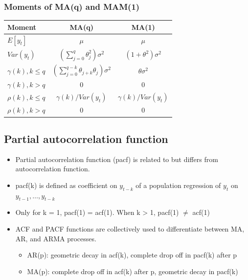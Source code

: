 \documentclass{article}
\begin{document}
\subsubsection{Moments of MA(q) and MAM(1)}
\begin{table}[h]
  \begin{center}
  \begin{tabular}{lcc}
       \textbf{Moment} & \textbf{MA(q)} & \textbf{MA(1)} \\
       \midrule
      $E[y_t]$ & $\mu$ & $\mu$ \\
      $Var(y_t)$ & $\left(\sum_{j=0}^q \theta^2_j \right)\sigma^2$& $(1 + \theta^2)\sigma^2$\\
      $\gamma(k), k \leq q$ & $\left(\sum_{j=0}^{q-k} \theta_{j+k}\theta_j \right)\sigma^2$& $\theta\sigma^2$ \\
      $\gamma(k), k > q$ & 0 & 0 \\
      $\rho(k), k \leq q$ & $\gamma(k)/Var(y_t)$ & $\gamma(k)/Var(y_t)$\\
      $\rho(k), k > q$ & 0& 0\\
      \bottomrule
  \end{tabular}
  \end{center}
\end{table}

\subsection{Partial autocorrelation function}
\begin{itemize}
  \item Partial autocorrelation function (pacf) is related to but differs from autocorrelation function.
  \item pacf(k) is defined as coefficient on $y_{t-k}$ of a population regression of $y_t$ on $y_{t-1}, \dots, y_{t-k}$
  \item Only for k = 1, pacf(1) = acf(1). When k > 1, pacf(1) $\neq$ acf(1)
  \item ACF and PACF functions are collectively used to differentiate between MA, AR, and ARMA processes.
  \begin{itemize}
    \item AR(p): geometric decay in acf(k), complete drop off in pacf(k) after p
    \item MA(p): complete drop off in acf(k) after p, geometric decay in pacf(k)
  \end{itemize}
\end{itemize}
\end{document}
